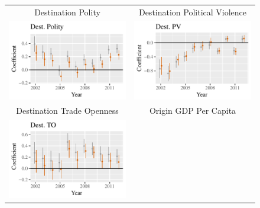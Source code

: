 \documentclass{article}
\begin{document}
\begin{figure}[htp]
\centering
\begin{tabular}{c@{\hskip -.4cm}c}
Destination Polity &
Destination Political Violence\\
\includegraphics[height=.22\textheight, clip=true, trim=0cm .5cm 0cm .1cm]{draft_figures/rl_plots/DestPolity.pdf}    &
\includegraphics[height=.22\textheight, clip=true, trim=.5cm .5cm 0cm .1cm]{draft_figures/rl_plots/DestPV.pdf}   \\
Destination Trade Openness &
Origin GDP Per Capita\\
\includegraphics[height=.22\textheight, clip=true, trim=0cm .5cm 0cm .1cm]{draft_figures/rl_plots/DestTO.pdf} &

\end{tabular}
\end{figure}
\end{document}
